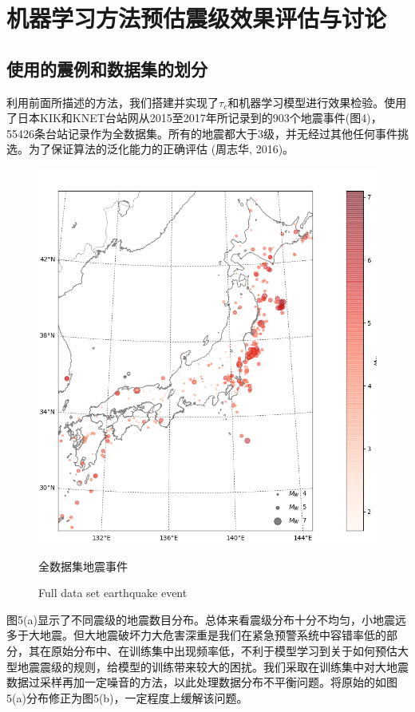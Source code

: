 \chapter{机器学习方法预估震级效果评估与讨论 }
\section{使用的震例和数据集的划分}
\indent 利用前面所描述的方法，我们搭建并实现了$\tau_{c}$和机器学习模型进行效果检验。使用了日本KIK和KNET台站网从2015至2017年所记录到的903个地震事件(图4)，55426条台站记录作为全数据集。所有的地震都大于3级，并无经过其他任何事件挑选。为了保证算法的泛化能力的正确评估 (周志华, 2016)。\\
\begin{figure}[!h] 
\centering 
 \includegraphics[width=0.8\linewidth]{img/basemap.jpg} 
 \renewcommand{\figurename}{图} 
\caption{全数据集地震事件} 
\addtocounter{figure}{-1} \vspace{-5pt} 
\renewcommand{\figurename}{Fig} 
\caption{Full data set earthquake event} 
\renewcommand{\figurename}{图} 
\label{fig:network-device-influence.png} 
\end{figure}
\indent 图5(a)显示了不同震级的地震数目分布。总体来看震级分布十分不均匀，小地震远多于大地震。但大地震破坏力大危害深重是我们在紧急预警系统中容错率低的部分，其在原始分布中、在训练集中出现频率低，不利于模型学习到关于如何预估大型地震震级的规则，给模型的训练带来较大的困扰。我们采取在训练集中对大地震数据过采样再加一定噪音的方法，以此处理数据分布不平衡问题。将原始的如图5(a)分布修正为图5(b)，一定程度上缓解该问题。\\
